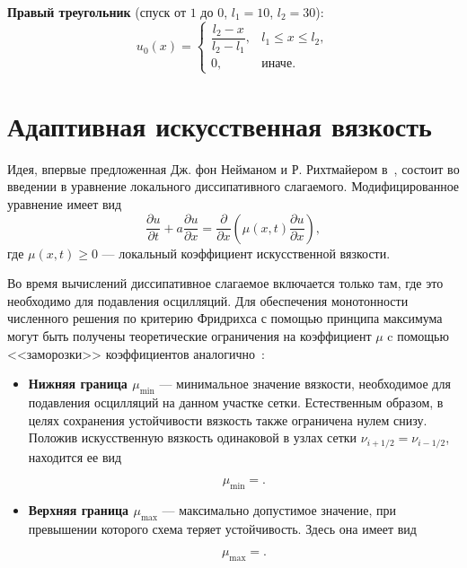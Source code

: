 \documentclass[14pt]{report}
\begin{document}
\noindent\textbf{Правый треугольник} (спуск от $1$ до $0$, $l_1=10$, $l_2=30$):
\[
u_0(x) = \begin{cases}
\dfrac{l_2-x}{l_2-l_1}, & l_1 \le x \le l_2,\\[6pt]
0, & \text{иначе}.
\end{cases}
\]


\section{Адаптивная искусственная вязкость}

Идея, впервые предложенная Дж. фон Нейманом и Р. Рихтмайером в~\cite{vonneumann1950}, состоит во введении в уравнение локального диссипативного слагаемого. Модифицированное уравнение имеет вид
\begin{equation}
\frac{\partial u}{\partial t} + a \frac{\partial u}{\partial x} 
= \frac{\partial}{\partial x}\left(\mu(x,t) \frac{\partial u}{\partial x}\right),
\label{eq:viscous}
\end{equation}
где $\mu(x,t) \ge 0$ --- локальный коэффициент искусственной вязкости.

Во время вычислений диссипативное слагаемое включается только там, где это необходимо для подавления осцилляций. Для обеспечения монотонности численного решения по критерию Фридрихса с помощью принципа максимума~\cite{samarsky1971} могут быть получены теоретические ограничения на коэффициент $\mu$ c помощью <<заморозки>> коэффициентов аналогично~\cite{popov2015}:

\begin{itemize}
\item \textbf{Нижняя граница $\mu_{\min}$} --- минимальное значение вязкости, необходимое для подавления осцилляций на данном участке сетки. Естественным образом, в целях сохранения устойчивости вязкость также ограничена нулем снизу. Положив искусственную вязкость одинаковой в узлах сетки $\nu_{i+1/2} = \nu_{i-1/2}$, находится ее вид

\begin{dmath*} 
\mu_{\min} = 
.
\end{dmath*}


\item \textbf{Верхняя граница $\mu_{\max}$} --- максимально допустимое значение, при превышении которого схема теряет устойчивость. Здесь она имеет вид

\[
\mu_{\max} = .
\]

\end{itemize}
\end{document}
